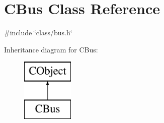 \hypertarget{class_c_bus}{\section{C\-Bus Class Reference}
\label{class_c_bus}
}


{\ttfamily \#include \char`\"{}class/bus.\-h\char`\"{}}

Inheritance diagram for C\-Bus\-:\begin{figure}[H]
\begin{center}
\leavevmode
\includegraphics[height=3.000000cm]{de/d89/class_c_bus}
\end{center}
\end{figure}
